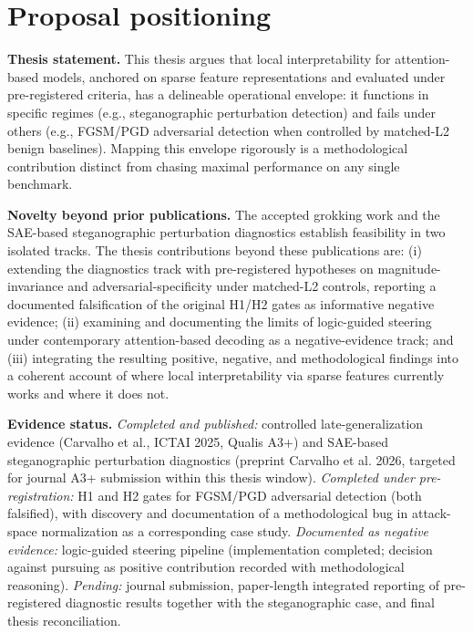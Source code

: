 ﻿\documentclass[../ppgc-tese.tex]{subfiles}
\begin{document}
\section{Proposal positioning}
\label{sec:proposal-positioning}
\textbf{Thesis statement.} This thesis argues that local interpretability for attention-based models, anchored on sparse feature representations and evaluated under pre-registered criteria, has a delineable operational envelope: it functions in specific regimes (e.g., steganographic perturbation detection) and fails under others (e.g., FGSM/PGD adversarial detection when controlled by matched-L2 benign baselines). Mapping this envelope rigorously is a methodological contribution distinct from chasing maximal performance on any single benchmark.

\textbf{Novelty beyond prior publications.} The accepted grokking work \cite{carvalho2025inducing_grokking_distribution_shifts} and the SAE-based steganographic perturbation diagnostics \cite{carvalho2026interpretable_stego_detection_sae} establish feasibility in two isolated tracks. The thesis contributions beyond these publications are: (i) extending the diagnostics track with pre-registered hypotheses on magnitude-invariance and adversarial-specificity under matched-L2 controls, reporting a documented falsification of the original H1/H2 gates as informative negative evidence; (ii) examining and documenting the limits of logic-guided steering under contemporary attention-based decoding as a negative-evidence track; and (iii) integrating the resulting positive, negative, and methodological findings into a coherent account of where local interpretability via sparse features currently works and where it does not.

\textbf{Evidence status.} \emph{Completed and published:} controlled late-generalization evidence (Carvalho et al., ICTAI 2025, Qualis A3+) and SAE-based steganographic perturbation diagnostics (preprint Carvalho et al. 2026, targeted for journal A3+ submission within this thesis window). \emph{Completed under pre-registration:} H1 and H2 gates for FGSM/PGD adversarial detection (both falsified), with discovery and documentation of a methodological bug in attack-space normalization as a corresponding case study. \emph{Documented as negative evidence:} logic-guided steering pipeline (implementation completed; decision against pursuing as positive contribution recorded with methodological reasoning). \emph{Pending:} journal submission, paper-length integrated reporting of pre-registered diagnostic results together with the steganographic case, and final thesis reconciliation.
\end{document}
